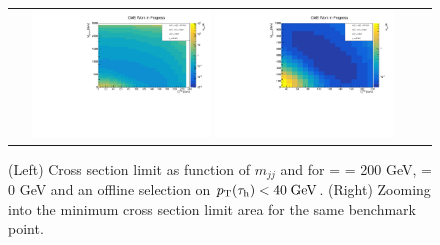 \begin{figure}[tbh!]
	\centering
	\begin{tabular}{cc}
		\includegraphics[width=0.45\textwidth]{analysis/pics/JetInvMass_vs_MET_xsec_chi200_lsp000_taupt40.pdf}
		\includegraphics[width=0.45\textwidth]{analysis/pics/JetInvMass_vs_MET_xsec_chi200_lsp000_taupt40_zoom.pdf}
	\end{tabular}
	\caption{(Left) Cross section limit as function of $m_{jj}$ and \met for \charginopm = \neutralinotwo = 200 GeV, \neutralinoone = 0 GeV and an offline selection on $p_{\text{T}}(\tau_{\text{h}}) <  40\;\text{Ge}\kern-0.06667em\text{V}$. (Right) Zooming into the minimum cross section limit area for the same benchmark point.}
	\label{fig::JetInvMass_vs_MET_xsec_chi200_lsp000_taupt40}
\end{figure}

